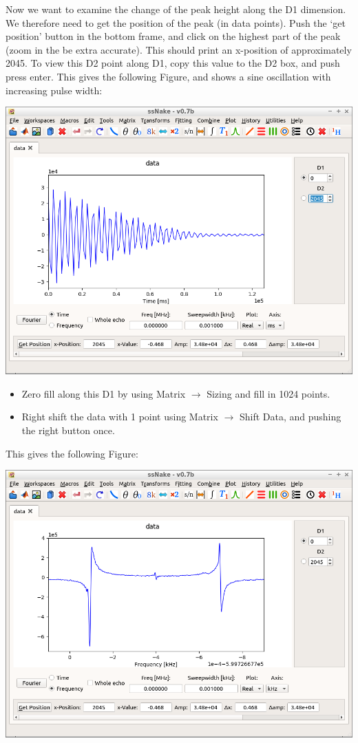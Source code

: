 \documentclass[11pt,a4paper]{article}
\begin{document}
Now we want to examine the change of the peak height along the D1 dimension. We therefore need to get the position of the peak (in data points). Push the `get position' button in the bottom frame, and click on the highest part of the peak (zoom in the be extra accurate). This should print an x-position of approximately  2045. To view this D2 point along D1, copy this value to the D2 box, and push press enter. This gives the following Figure, and shows a sine oscillation with increasing pulse width:
\begin{center}
\includegraphics[width=0.8\linewidth]{Figs/Fig2.png}
\end{center}


\begin{itemize}
\item Zero fill along this D1 by using Matrix $\longrightarrow$ Sizing and fill in 1024 points.
\item Right shift the data with 1 point using Matrix $\longrightarrow$ Shift Data, and pushing the right button once. 
\end{itemize}
This gives the following Figure:
\begin{center}
\includegraphics[width=0.8\linewidth]{Figs/Fig3.png}
\end{center}
\end{document}
